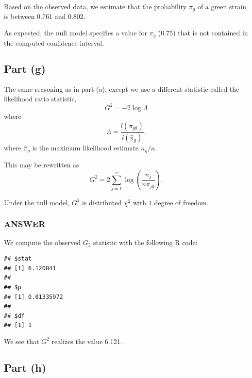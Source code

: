 \documentclass[
]{article}
\newenvironment{Shaded}{\begin{snugshade}}{\end{snugshade}}
\newcommand{\FloatTok}[1]{\textcolor[rgb]{0.00,0.00,0.81}{#1}}
\newcommand{\FunctionTok}[1]{\textcolor[rgb]{0.13,0.29,0.53}{\textbf{#1}}}
\newcommand{\NormalTok}[1]{#1}
\newcommand{\OtherTok}[1]{\textcolor[rgb]{0.56,0.35,0.01}{#1}}
\newcommand{\SpecialCharTok}[1]{\textcolor[rgb]{0.81,0.36,0.00}{\textbf{#1}}}
\begin{document}
Based on the observed data, we estimate that the probability \(\pi_g\)
of a green strain is between 0.761 and 0.802.

As expected, the null model specifies a value for \(\pi_g\) (\(0.75\))
that is not contained in the computed confidence interval.

\hypertarget{part-g}{%
\subsection{Part (g)}\label{part-g}}


The same reasoning as in part (a), except we use a different statistic
called the likelihood ratio statistic, \[
  G^2 = - 2 \log \Lambda
\] where \[
  \Lambda = \frac{l(\pi_{g 0})}{l(\hat{\pi}_g)}.
\] where \(\hat{\pi}_g\) is the maximum likelihood estimate \(n_g / n\).

This may be rewritten as \[
  G^2 = 2 \sum_{j=1}^{c} \log\left(\frac{n_j}{n \pi_{j 0}}\right).
\]

Under the null model, \(G^2\) is distributed \(\chi^2\) with \(1\)
degree of freedom.

\hypertarget{answer-6}{%
\subsubsection{ANSWER}\label{answer-6}}

We compute the observed \(G_2\) statistic with the following R code:

\begin{Shaded}
\end{Shaded}

\begin{verbatim}
## $stat
## [1] 6.120841
## 
## $p
## [1] 0.01335972
## 
## $df
## [1] 1
\end{verbatim}

We see that \(G^2\) realizes the value 6.121.

\hypertarget{part-h}{%
\subsection{Part (h)}\label{part-h}}
\end{document}
